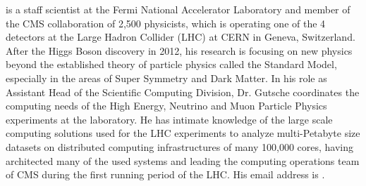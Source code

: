 \documentclass{wscpaperproc}
\theoremstyle{wsc}
\begin{document}
 is a staff scientist at the Fermi National Accelerator Laboratory and member of the CMS collaboration of 2,500 physicists, which is operating one of the 4 detectors at the Large Hadron Collider (LHC) at CERN in Geneva, Switzerland. After the Higgs Boson discovery in 2012, his research is focusing on new physics beyond the established theory of particle physics called the Standard Model, especially in the areas of Super Symmetry and Dark Matter. In his role as Assistant Head of the Scientific Computing Division, Dr. Gutsche coordinates the computing needs of the High Energy, Neutrino and Muon Particle Physics experiments at the laboratory. He has intimate knowledge of the large scale computing solutions used for the LHC experiments to analyze multi-Petabyte size datasets on distributed computing infrastructures of many 100,000 cores, having architected many of the used systems and leading the computing operations team of CMS during the first running period of the LHC. His email address is .\\
\end{document}
